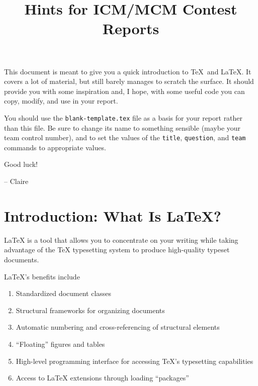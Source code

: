 \documentclass{icmmcm}
\title{\latex Hints for ICM/MCM Contest Reports}
\newcommand{\bslash}{\symbol{'134}}%
\newcommand{\bsl}{{\texttt{\bslash}}}
\newcommand{\com}[1]{\bsl\texttt{#1}\xspace}
\newcommand{\file}[1]{\texttt{#1}\xspace}
\newcommand{\tex}{\TeX\xspace}
\newcommand{\latex}{\LaTeX\xspace}
\begin{document}
\maketitle
\begin{summary}
  This document is meant to give you a quick introduction to \TeX\ and
  \LaTeX.  It covers a lot of material, but still barely manages to
  scratch the surface.  It should provide you with some inspiration
  and, I hope, with some useful code you can copy, modify, and use in
  your report.

  You should use the \file{blank-template.tex} file as a basis for
  your report rather than this file.  Be sure to change its name to
  something sensible (maybe your team control number), and to set the
  values of the \com{title}, \com{question}, and \com{team} commands
  to appropriate values.

  Good luck!

  \hfill{}-- Claire
\end{summary}
 


\tableofcontents

\listoffigures
\listoftables  
 



\section{Introduction: What Is \latex?}%
\label{sec:introduction}

\latex is a tool that allows you to concentrate on your writing while
taking advantage of the \tex typesetting system to produce
high-quality typeset documents.

\latex's benefits include
\begin{enumerate}
\item Standardized document classes
\item Structural frameworks for organizing documents
\item Automatic numbering and cross-referencing of structural elements
\item ``Floating'' figures and tables
\item High-level programming interface for accessing \tex's
  typesetting capabilities
\item Access to \latex extensions through loading ``packages''
\end{enumerate}
\end{document}
